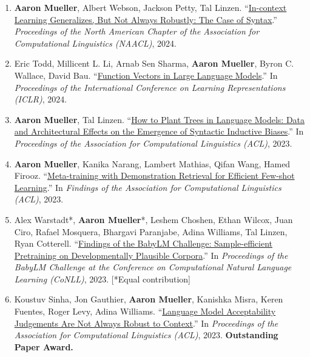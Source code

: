 \documentclass[10pt]{article}
\providecommand*\titlelink[2]{\href{#1}{\textcolor{accent}{#2}}}
\begin{document}
\begin{enumerate}[leftmargin=*, topsep=0pt, itemsep=0.25ex, partopsep=0ex, parsep=1ex, label=C\arabic*., ref=C\arabic*]
	\item \textbf{Aaron Mueller}, Albert Webson, Jackson Petty, Tal Linzen. ``\titlelink{https://arxiv.org/abs/2311.07811}{In-context Learning Generalizes, But Not Always Robustly: The Case of Syntax}.'' \emph{Proceedings of the North American Chapter of the Association for Computational Linguistics (NAACL)}, 2024.\label{pub:icl-ood}
	
	\item Eric Todd, Millicent L. Li, Arnab Sen Sharma, \textbf{Aaron Mueller}, Byron C. Wallace, David Bau. ``\titlelink{https://arxiv.org/abs/2310.15213}{Function Vectors in Large Language Models}.'' In \emph{Proceedings of the International Conference on Learning Representations (ICLR)}, 2024.\label{pub:function-vectors}
		
	\item \textbf{Aaron Mueller}, Tal Linzen. ``\titlelink{https://arxiv.org/abs/2305.19905}{How to Plant Trees in Language Models: Data and Architectural Effects on the Emergence of Syntactic Inductive Biases}.'' In \emph{Proceedings of the Association for Computational Linguistics (ACL)}, 2023.
		
	\item \textbf{Aaron Mueller}, Kanika Narang, Lambert Mathias, Qifan Wang, Hamed Firooz. ``\titlelink{https://arxiv.org/abs/2307.00119}{Meta-training with Demonstration Retrieval for Efficient Few-shot Learning}.'' In \textit{Findings of the Association for Computational Linguistics (ACL)}, 2023.\label{pub:metalearn}
	
	\item Alex Warstadt*, \textbf{Aaron Mueller}*, Leshem Choshen, Ethan Wilcox, Juan Ciro, Rafael Mosquera, Bhargavi Paranjabe, Adina Williams, Tal Linzen, Ryan Cotterell. ``\titlelink{https://arxiv.org/abs/2301.11796}{Findings of the BabyLM Challenge: Sample-efficient Pretraining on Developmentally Plausible Corpora}.'' In \emph{Proceedings of the BabyLM Challenge at the Conference on Computational Natural Language Learning (CoNLL)}, 2023. [*Equal contribution]
	
	\item Koustuv Sinha, Jon Gauthier, \textbf{Aaron Mueller}, Kanishka Misra, Keren Fuentes, Roger Levy, Adina Williams. ``\titlelink{https://arxiv.org/abs/2212.08979}{Language Model Acceptability Judgements Are Not Always Robust to Context}.'' In \emph{Proceedings of the Association for Computational Linguistics (ACL)}, 2023. \textbf{\textcolor{accent}{Outstanding Paper Award.}}
	

\end{enumerate}
\end{document}
